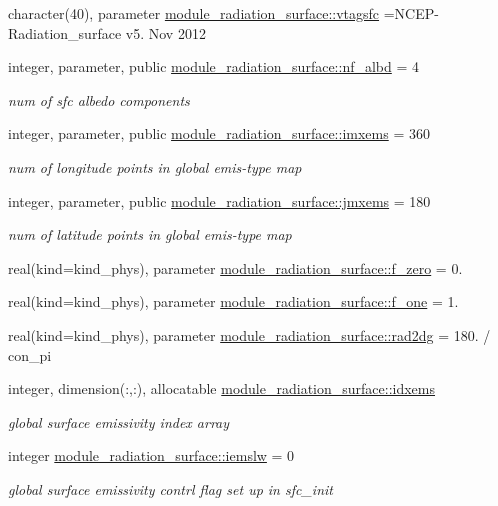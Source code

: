 \begin{DoxyCompactItemize}
\item 
character(40), parameter \hyperlink{namespacemodule__radiation__surface_ab0b8c10a0fb6be2644fdf91e3fe1fc5c}{module\+\_\+radiation\+\_\+surface\+::vtagsfc} =\textquotesingle{}N\+C\+EP-\/Radiation\+\_\+surface v5. Nov 2012 \textquotesingle{}
\item 
integer, parameter, public \hyperlink{namespacemodule__radiation__surface_ab7800982c900bd632ca74d5e7d2b5ab3}{module\+\_\+radiation\+\_\+surface\+::nf\+\_\+albd} = 4
\begin{DoxyCompactList}\small\item\em num of sfc albedo components \end{DoxyCompactList}\item 
integer, parameter, public \hyperlink{namespacemodule__radiation__surface_aab4b9853c71ff40f8db2aa78b7cab265}{module\+\_\+radiation\+\_\+surface\+::imxems} = 360
\begin{DoxyCompactList}\small\item\em num of longitude points in global emis-\/type map \end{DoxyCompactList}\item 
integer, parameter, public \hyperlink{namespacemodule__radiation__surface_a3922674f1c727d517ba5b0f7f5093970}{module\+\_\+radiation\+\_\+surface\+::jmxems} = 180
\begin{DoxyCompactList}\small\item\em num of latitude points in global emis-\/type map \end{DoxyCompactList}\item 
real(kind=kind\+\_\+phys), parameter \hyperlink{namespacemodule__radiation__surface_a86e4f42e46e188303b9a8e4d503d1acb}{module\+\_\+radiation\+\_\+surface\+::f\+\_\+zero} = 0.
\item 
real(kind=kind\+\_\+phys), parameter \hyperlink{namespacemodule__radiation__surface_a91cec823f595387c92d659d89f307f42}{module\+\_\+radiation\+\_\+surface\+::f\+\_\+one} = 1.
\item 
real(kind=kind\+\_\+phys), parameter \hyperlink{namespacemodule__radiation__surface_ab879c7cf4e0774089a626e54226e4c1b}{module\+\_\+radiation\+\_\+surface\+::rad2dg} = 180. / con\+\_\+pi
\item 
integer, dimension(\+:,\+:), allocatable \hyperlink{namespacemodule__radiation__surface_ac33f1f3441f8336d7eb7e15cba26caf7}{module\+\_\+radiation\+\_\+surface\+::idxems}
\begin{DoxyCompactList}\small\item\em global surface emissivity index array \end{DoxyCompactList}\item 
integer \hyperlink{namespacemodule__radiation__surface_a3ceebb99dbffcb70a14cfcaa7b029abc}{module\+\_\+radiation\+\_\+surface\+::iemslw} = 0
\begin{DoxyCompactList}\small\item\em global surface emissivity contrl flag set up in \textquotesingle{}sfc\+\_\+init\textquotesingle{} \end{DoxyCompactList}\end{DoxyCompactItemize}
